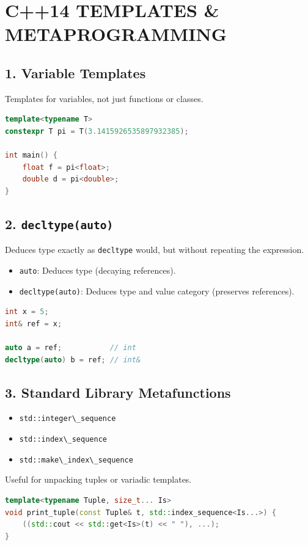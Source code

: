 \hypertarget{c14-templates-metaprogramming}{%
\chapter{C++14 TEMPLATES \&
METAPROGRAMMING}\label{c14-templates-metaprogramming}}

\hypertarget{variable-templates}{%
\section{1. Variable Templates}\label{variable-templates}}

Templates for variables, not just functions or classes.

\begin{lstlisting}[language={C++}]
template<typename T>
constexpr T pi = T(3.1415926535897932385);

int main() {
    float f = pi<float>;
    double d = pi<double>;
}
\end{lstlisting}

\hypertarget{decltypeauto}{%
\section{\texorpdfstring{2.
\texttt{decltype(auto)}}{2. decltype(auto)}}\label{decltypeauto}}

Deduces type exactly as \passthrough{\lstinline!decltype!} would, but
without repeating the expression.

\begin{itemize}
\tightlist
\item
  \passthrough{\lstinline!auto!}: Deduces type (decaying references).
\item
  \passthrough{\lstinline!decltype(auto)!}: Deduces type and value
  category (preserves references).
\end{itemize}

\begin{lstlisting}[language={C++}]
int x = 5;
int& ref = x;

auto a = ref;           // int
decltype(auto) b = ref; // int&
\end{lstlisting}

\hypertarget{standard-library-metafunctions}{%
\section{3. Standard Library
Metafunctions}\label{standard-library-metafunctions}}

\begin{itemize}
\tightlist
\item
  \passthrough{\lstinline!std::integer\_sequence!}
\item
  \passthrough{\lstinline!std::index\_sequence!}
\item
  \passthrough{\lstinline!std::make\_index\_sequence!}
\end{itemize}

Useful for unpacking tuples or variadic templates.

\begin{lstlisting}[language={C++}]
template<typename Tuple, size_t... Is>
void print_tuple(const Tuple& t, std::index_sequence<Is...>) {
    ((std::cout << std::get<Is>(t) << " "), ...);
}
\end{lstlisting}
